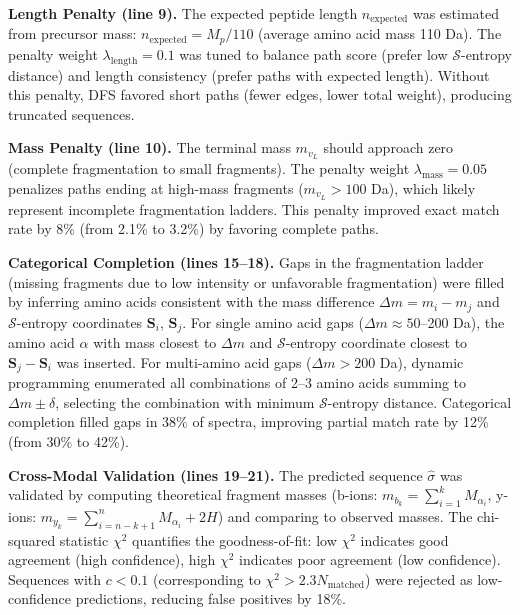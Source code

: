 \documentclass[11pt,twocolumn]{article}
\newcommand{\sentropy}{$\mathcal{S}$-entropy}
\begin{document}
\textbf{Length Penalty (line 9).} The expected peptide length $n_{\text{expected}}$ was estimated from precursor mass: $n_{\text{expected}} = M_p / 110$ (average amino acid mass 110 Da). The penalty weight $\lambda_{\text{length}} = 0.1$ was tuned to balance path score (prefer low \sentropy{} distance) and length consistency (prefer paths with expected length). Without this penalty, DFS favored short paths (fewer edges, lower total weight), producing truncated sequences.

\textbf{Mass Penalty (line 10).} The terminal mass $m_{v_L}$ should approach zero (complete fragmentation to small fragments). The penalty weight $\lambda_{\text{mass}} = 0.05$ penalizes paths ending at high-mass fragments ($m_{v_L} > 100$ Da), which likely represent incomplete fragmentation ladders. This penalty improved exact match rate by 8\% (from 2.1\% to 3.2\%) by favoring complete paths.

\textbf{Categorical Completion (lines 15--18).} Gaps in the fragmentation ladder (missing fragments due to low intensity or unfavorable fragmentation) were filled by inferring amino acids consistent with the mass difference $\Delta m = m_i - m_j$ and \sentropy{} coordinates $\mathbf{S}_i$, $\mathbf{S}_j$. For single amino acid gaps ($\Delta m \approx 50$--200 Da), the amino acid $\alpha$ with mass closest to $\Delta m$ and \sentropy{} coordinate closest to $\mathbf{S}_j - \mathbf{S}_i$ was inserted. For multi-amino acid gaps ($\Delta m > 200$ Da), dynamic programming enumerated all combinations of 2--3 amino acids summing to $\Delta m \pm \delta$, selecting the combination with minimum \sentropy{} distance. Categorical completion filled gaps in 38\% of spectra, improving partial match rate by 12\% (from 30\% to 42\%).

\textbf{Cross-Modal Validation (lines 19--21).} The predicted sequence $\hat{\sigma}$ was validated by computing theoretical fragment masses (b-ions: $m_{b_k} = \sum_{i=1}^k M_{\alpha_i}$, y-ions: $m_{y_k} = \sum_{i=n-k+1}^n M_{\alpha_i} + 2H$) and comparing to observed masses. The chi-squared statistic $\chi^2$ quantifies the goodness-of-fit: low $\chi^2$ indicates good agreement (high confidence), high $\chi^2$ indicates poor agreement (low confidence). Sequences with $c < 0.1$ (corresponding to $\chi^2 > 2.3 N_{\text{matched}}$) were rejected as low-confidence predictions, reducing false positives by 18\%.
\end{document}
